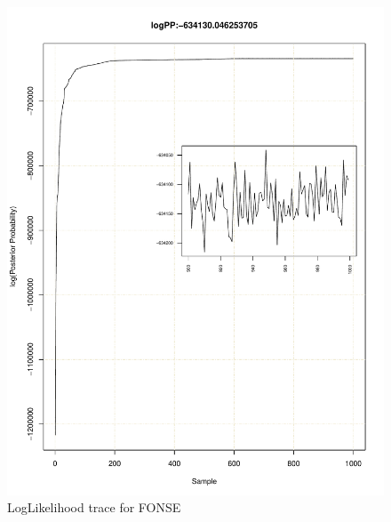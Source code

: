 \documentclass[11pt]{labbook}
\begin{document}
    \begin{figure}
        \centering
        \includegraphics[scale=.65]{FONSE_Plots/2016/July_28/LogLikeTrace}
        \caption{LogLikelihood trace for FONSE}
        \label{fig:JULY28_LIKE}
    \end{figure}
\end{document}
